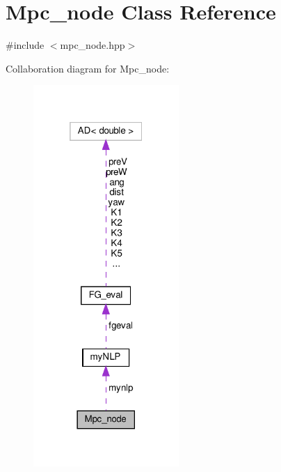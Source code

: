 \hypertarget{classMpc__node}{}\section{Mpc\+\_\+node Class Reference}
\label{classMpc__node}


{\ttfamily \#include $<$mpc\+\_\+node.\+hpp$>$}



Collaboration diagram for Mpc\+\_\+node\+:
\nopagebreak
\begin{figure}[H]
\begin{center}
\leavevmode
\includegraphics[width=157pt]{classMpc__node__coll__graph}
\end{center}
\end{figure}
